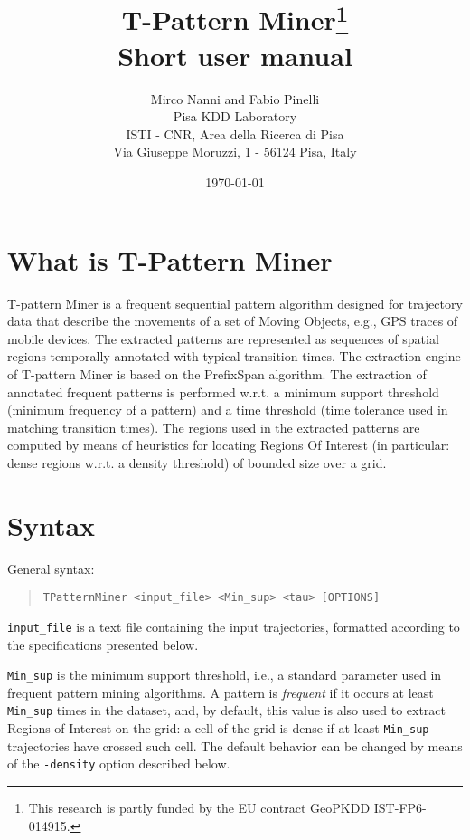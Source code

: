 \documentclass[12pt]{article}
\begin{document}
\pagestyle{empty}

\title{T-Pattern Miner\footnote{This research is partly funded by the EU contract GeoPKDD
IST-FP6-014915.}\\ \small Short user manual}

\author{Mirco Nanni and Fabio Pinelli \\[4mm]
Pisa KDD Laboratory \\
\small ISTI - CNR, Area della Ricerca di Pisa \\ \small Via Giuseppe Moruzzi, 1 - 56124 Pisa, Italy }
\vspace{10mm}
\date{\today}

\maketitle

\pagestyle{plain}
\clearpage
\tableofcontents
\pagestyle{plain}
\clearpage
\section{What is T-Pattern Miner}
T-pattern Miner is a frequent sequential pattern algorithm designed for trajectory data that describe the movements of a set of Moving Objects, e.g., GPS traces of mobile devices. The extracted patterns are represented as sequences of spatial regions temporally annotated with typical transition times. The extraction engine of T-pattern Miner is based on the PrefixSpan algorithm. The extraction of annotated frequent patterns is performed w.r.t. a minimum support threshold (minimum frequency of a pattern) and a time threshold (time tolerance used in matching transition times). The regions used in the extracted patterns are computed by means of heuristics for locating Regions Of Interest (in particular: dense regions w.r.t. a density threshold) of bounded size over a grid.

\section{Syntax}

General syntax:
\begin{quotation}
\texttt{TPatternMiner <input\_file> <Min\_sup> <tau> [OPTIONS]}
\end{quotation}

{\tt input\_file} is a text file containing the input trajectories, formatted according to the specifications presented below.

{\tt Min\_sup} is the minimum support threshold, i.e., a standard parameter used in frequent pattern mining algorithms. A pattern is {\em frequent} if it occurs at least {\tt Min\_sup} times in the dataset, and, by default, this value is also used to extract Regions of Interest on the grid: a cell of the grid is dense if at least {\tt Min\_sup} trajectories have crossed such cell. The default behavior can be changed by means of the {\tt -density} option described below.
\end{document}
